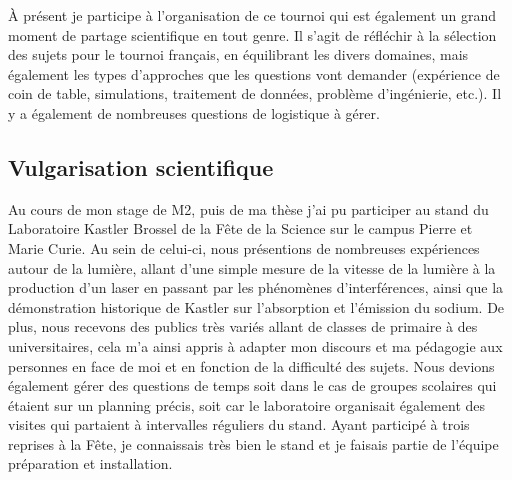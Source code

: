 \documentclass[a4paper,11pt]{article} %
\begin{document}
	\`A présent je participe à l'organisation de ce tournoi qui est également un grand moment de partage scientifique en tout genre. Il s'agit de réfléchir à la sélection des sujets pour le tournoi français, en équilibrant les divers domaines, mais également les types d'approches que les questions vont demander (expérience de coin de table, simulations, traitement de données, problème d'ingénierie, etc.). Il y a également de nombreuses questions de logistique à gérer.
	
	
	\subsection{Vulgarisation scientifique}
	Au cours de mon stage de M2, puis de ma thèse j'ai pu participer au stand du Laboratoire Kastler Brossel de la Fête de la Science sur le campus Pierre et Marie Curie. Au sein de celui-ci, nous présentions de nombreuses expériences autour de la lumière, allant d'une \textgravedbl simple\textacutedbl{} mesure de la vitesse de la lumière à la production d'un laser en passant par les phénomènes d'interférences, ainsi que la démonstration historique de Kastler sur l'absorption et l'émission du sodium. De plus, nous recevons des publics très variés allant de classes de primaire à des universitaires, cela m'a ainsi appris à adapter mon discours et ma pédagogie aux personnes en face de moi et en fonction de la difficulté des sujets. Nous devions également gérer des questions de temps soit dans le cas de groupes scolaires qui étaient sur un planning précis, soit car le laboratoire organisait également des visites qui partaient à intervalles réguliers du stand. Ayant participé à trois reprises à la Fête, je connaissais très bien le stand et je faisais partie de l'équipe préparation et installation.
	
\end{document}

